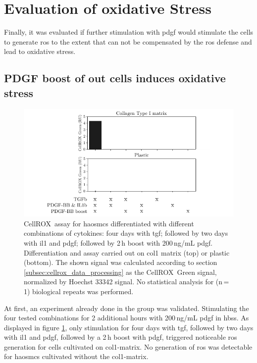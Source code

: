 \section{Evaluation of oxidative Stress}
\label{sec:oxStress}
Finally, it was evaluated if further stimulation with \ac{pdgf} would stimulate the cells to generate \ac{ros} to the extent that can not be compensated by the \ac{ros} defense and lead to oxidative stress.

    \subsection{PDGF boost of out cells induces oxidative stress}

    \begin{figure}[h!]
    \capstart
        \centering
    	\includegraphics{Abbildung/CellROX_initial_cond.pdf}

    	\begin{minipage}{\captionwidth}
    		\caption[repeat_Lisa]{ \newline CellROX\texttrademark~assay for \acp{haosmc} differentiated with different combinations of cytokines: four days with \ac{tgf}; followed by two days with \ac{il1} and \ac{pdgf}; followed by 2\,h boost with 200\,ng/mL \ac{pdgf}. Differentiation and assay carried out on \ac{col1} matrix (top) or plastic (bottom). The shown signal was calculated according to section \ref{subsec:cellrox_data_processing} as the CellROX\texttrademark~Green signal, normalized by Hoechst 33342 signal. No statistical analysis for (n\,=\,1) biological repeats was performed. }
    		\label{fig:cellrox_8con}
    	\end{minipage}
    \end{figure}

    At first, an experiment already done in the group was validated. Stimulating the four tested combinations for 2 additional hours with 200\,ng/mL \ac{pdgf} in \ac{hbss}. As displayed in figure \ref{fig:cellrox_8con}, only stimulation for four days with \ac{tgf}, followed by two days with \ac{il1} and \ac{pdgf}, followed by a 2\,h boost with \ac{pdgf}, triggered noticeable \ac{ros} generation for cells cultivated on \ac{col1}-matrix. No generation of \ac{ros} was detectable for \acp{haosmc} cultivated without the \ac{col1}-matrix.

